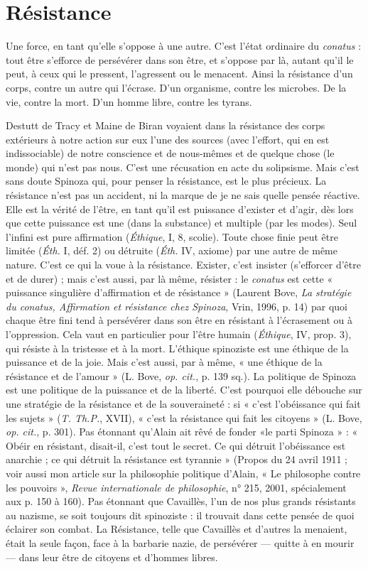 \section{Résistance}
Une force, en tant qu’elle s'oppose à une autre. C’est l’état
ordinaire du {\it conatus} : tout être s'efforce de persévérer dans
son être, et s’oppose par là, autant qu’il le peut, à ceux qui le pressent, l’agressent
ou le menacent. Ainsi la résistance d’un corps, contre un autre qui l’écrase.
D'un organisme, contre les microbes. De la vie, contre la mort. D’un homme
libre, contre les tyrans.

Destutt de Tracy et Maine de Biran voyaient dans la résistance des corps
extérieurs à notre action sur eux l’une des sources (avec l'effort, qui en est indissociable)
de notre conscience et de nous-mêmes et de quelque chose (le monde)
qui n’est pas nous. C’est une récusation en acte du solipsisme. Mais c’est sans
doute Spinoza qui, pour penser la résistance, est le plus précieux. La résistance
n’est pas un accident, ni la marque de je ne sais quelle pensée réactive. Elle est
la vérité de l'être, en tant qu'il est puissance d’exister et d’agir, dès lors que cette
puissance est une (dans la substance) et multiple (par les modes). Seul l'infini
est pure affirmation ({\it Éthique}, I, 8, scolie). Toute chose finie peut être limitée
({\it Éth.} I, déf. 2) ou détruite ({\it Éth.} IV, axiome) par une autre de même nature.
C’est ce qui la voue à la résistance. Exister, c’est insister (s’efforcer d’être et de
durer) ; mais c’est aussi, par là même, résister : le {\it conatus} est cette « puissance
singulière d’affirmation et de résistance » (Laurent Bove, {\it La stratégie du conatus,
Affirmation et résistance chez Spinoza}, Vrin, 1996, p. 14) par quoi chaque être
fini tend à persévérer dans son être en résistant à l’écrasement ou à l'oppression.
Cela vaut en particulier pour l'être humain ({\it Éthique}, IV, prop. 3), qui résiste à
la tristesse et à la mort. L’éthique spinoziste est une éthique de la puissance et
de la joie. Mais c’est aussi, par à même, « une éthique de la résistance et de
l'amour » (L. Bove, {\it op. cit.}, p. 139 sq.). La politique de Spinoza est une politique
de la puissance et de la liberté. C’est pourquoi elle débouche sur une stratégie
de la résistance et de la souveraineté : si « c’est l’obéissance qui fait les
sujets » ({\it T. Th.P.}, XVII), « c’est la résistance qui fait les citoyens » (L. Bove, {\it op.
cit.}, p. 301). Pas étonnant qu’Alain ait rêvé de fonder «le parti Spinoza » :
« Obéir en résistant, disait-il, c’est tout le secret. Ce qui détruit l’obéissance est
anarchie ; ce qui détruit la résistance est tyrannie » (Propos du 24 avril 1911 ;
voir aussi mon article sur la philosophie politique d’Alain, « Le philosophe
contre les pouvoirs », {\it Revue internationale de philosophie}, n° 215, 2001, spécialement
aux p. 150 à 160). Pas étonnant que Cavaillès, l’un de nos plus grands
résistants au nazisme, se soit toujours dit spinoziste : il trouvait dans cette
pensée de quoi éclairer son combat. La Résistance, telle que Cavaillès et
d’autres la menaient, était la seule façon, face à la barbarie nazie, de persévérer
— quitte à en mourir — dans leur être de citoyens et d'hommes libres.

